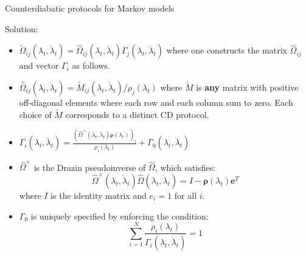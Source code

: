 \documentclass{beamer}
\begin{document}
\begin{frame}{Counterdiabatic protocols for Markov models}

  \vspace{0.25em}
         {\color{red} Solution:}
         \vspace{0.25em}
  \begin{itemize}
  \item 
    $\tilde{\Omega}_{ij}(\lambda_t,\dot\lambda_t) = \hat{\Omega}_{ij}(\lambda_t,\dot\lambda_t) \Gamma_{j}(\lambda_t,\dot\lambda_t)$ where one constructs the matrix $\hat{\Omega}_{ij}$ and vector $\Gamma_i$ as follows.

    \vspace{0.25em}
    \pause

  \item $\hat{\Omega}_{ij}(\lambda_t,\dot\lambda_t) = \tilde{M}_{ij}(\lambda_t,\dot\lambda_t)/\rho_j(\lambda_t)$ where $\tilde{M}$ is {\bf\color{blue} any} matrix with positive off-diagonal elements where each row and each column sum to zero.  {\color{blue}Each choice of $\tilde{M}$ corresponds to a distinct CD protocol.}

    \pause
    \vspace{0.25em}
  \item $\Gamma_i(\lambda_t,\dot\lambda_t) = \frac{\left(\hat{\Omega}^\times(\lambda_t,\dot\lambda_t) \dot{\bm{\rho}}(\lambda_t)\right)_i}{\rho_i(\lambda_t)} + \Gamma_0(\lambda_t,\dot\lambda_t)$

   \pause
    \vspace{0.25em}
  \item $\hat{\Omega}^\times$ is the Drazin pseudoinverse of $\hat{\Omega}$, which satisfies:
    \[
    \hat{\Omega}^\times(\lambda_t,\dot\lambda_t) \hat{\Omega}(\lambda_t,\dot\lambda_t) = I - \bm{\rho}(\lambda_t) \bm{e}^T
    \]
    where $I$ is the identity matrix and $e_i = 1$ for all $i$.

    \pause
    \vspace{0.25em}

  \item $\Gamma_0$ is uniquely specified by enforcing the condition:
    \[
    \sum_{i=1}^N \frac{\rho_i(\lambda_t)}{\Gamma_i(\lambda_t,\dot\lambda_t)}  = 1
    \]
    

  \end{itemize}
  
\end{frame}
\end{document}
